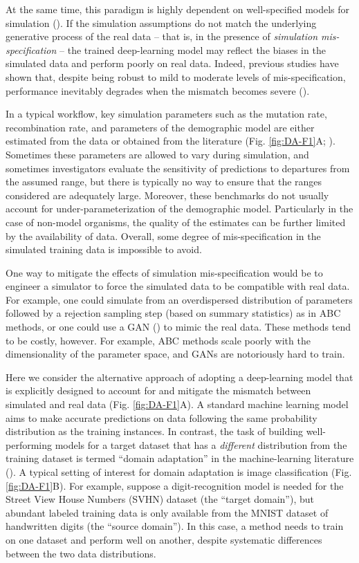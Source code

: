 At the same time, this paradigm is highly dependent on well-specified models for simulation (\cite{korfmann_deep_2023}). If the simulation assumptions do not match the underlying generative process of the real data -- that is, in the presence of \textit{simulation mis-specification} -- the trained deep-learning model may reflect the biases in the simulated data and perform poorly on real data. Indeed, previous studies have shown that, despite being robust to mild to moderate levels of mis-specification, performance inevitably degrades when the mismatch becomes severe (\cite{adrion_predicting_2020,hejase_deep-learning_2022}).

In a typical workflow, key simulation parameters such as the mutation rate, recombination rate, and parameters of the demographic model are either estimated from the data or obtained from the literature (Fig. \ref{fig:DA-F1}A; \cite{adrion_community-maintained_2020,lauterbur_expanding_2022}). Sometimes these parameters are allowed to vary during simulation, and sometimes investigators evaluate the sensitivity of predictions to departures from the assumed range, but there is typically no way to ensure that the ranges considered are adequately large. Moreover, these benchmarks do not usually account for under-parameterization of the demographic model. Particularly in the case of non-model organisms, the quality of the estimates can be further limited by the availability of data. Overall, some degree of mis-specification in the simulated training data is impossible to avoid.

One way to mitigate the effects of simulation mis-specification would be to engineer a simulator to force the simulated data to be compatible with real data. For example, one could simulate from an overdispersed distribution of parameters followed by a rejection sampling step (based on summary statistics) as in \acf{ABC} methods, or one could use a \ac{GAN} (\cite{wang_automatic_2021}) to mimic the real data. These methods tend to be costly, however. For example, \ac{ABC} methods scale poorly with the dimensionality of the parameter space, and \acp{GAN} are notoriously hard to train.

Here we consider the alternative approach of adopting a deep-learning model that is explicitly designed to account for and mitigate the mismatch between simulated and real data (Fig. \ref{fig:DA-F1}A). A standard machine learning model aims to make accurate predictions on data following the same probability distribution as the training instances. In contrast, the task of building well-performing models for a target dataset that has a \textit{different} distribution from the training dataset is termed “domain adaptation” in the machine-learning literature (\cite{csurka_comprehensive_2017,wilson_survey_2020}). A typical setting of interest for domain adaptation is image classification (Fig. \ref{fig:DA-F1}B). For example, suppose a digit-recognition model is needed for the Street View House Numbers (SVHN) dataset (the “target domain”), but abundant labeled training data is only available from the MNIST dataset of handwritten digits (the “source domain”). In this case, a method needs to train on one dataset and perform well on another, despite systematic differences between the two data distributions.

